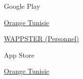

\begin{cventries}

  \cventrylight
    {Google Play} 
    {
      \begin{cvitems} %
        \item {\href{https://play.google.com/store/apps/developer?id=Orange+Tunisie}{Orange Tunisie}}
        \item { \href{https://play.google.com/store/apps/dev?id=7822449653070237293}{WAPPSTER (Personnel)}}
      \end{cvitems}
    }

	\cventrylight
		{App Store} 
		{
			\begin{cvitems} %
				\item {\href{https://itunes.apple.com/us/developer/id923409243}{Orange Tunisie}}
			\end{cvitems}
		}

\end{cventries}
